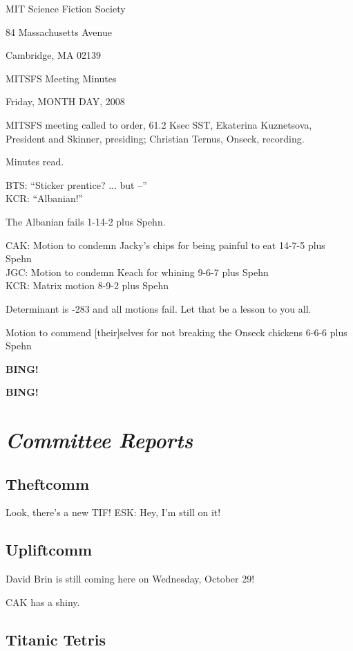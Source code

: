 \documentclass[10pt]{article}
\newcommand{\bing}{{\bf BING!} }
\newcommand{\goto}[1]{\bing \vskip 12pt \section*{{\em{#1}}}}
\newcommand{\ps}{ plus Spehn\xspace}
\begin{document}
\begin{center}

MIT Science Fiction Society

84 Massachusetts Avenue

Cambridge, MA 02139

\vspace{12pt}

MITSFS Meeting Minutes

Friday, MONTH DAY, 2008

\end{center}

\vspace{18pt}

\setlength{\parskip}{6pt}

\noindent
MITSFS meeting called to order, 61.2 Ksec SST,
Ekaterina Kuznetsova, President and Skinner, presiding; Christian Ternus, Onseck, recording.

Minutes read.

BTS: ``Sticker prentice? ... but --''\\
KCR: ``Albanian!''

The Albanian fails 1-14-2 \ps.

CAK: Motion to condemn Jacky's chips for being painful to eat 14-7-5 \ps \\
JGC:  Motion to condemn Keach for whining 9-6-7 \ps \\
KCR:  Matrix motion 8-9-2 \ps

Determinant is -283 and all motions fail.  Let that be a lesson to you all.

Motion to commend [their]selves for not breaking the Onseck chickens 6-6-6 \ps

\bing

\goto{Committee Reports}

\subsection*{Theftcomm}

Look, there's a new TIF!  ESK: Hey, I'm still on it!

\subsection*{Upliftcomm}

David Brin is still coming here on Wednesday, October 29!

CAK has a shiny.

\subsection*{Titanic Tetris}
\end{document}
